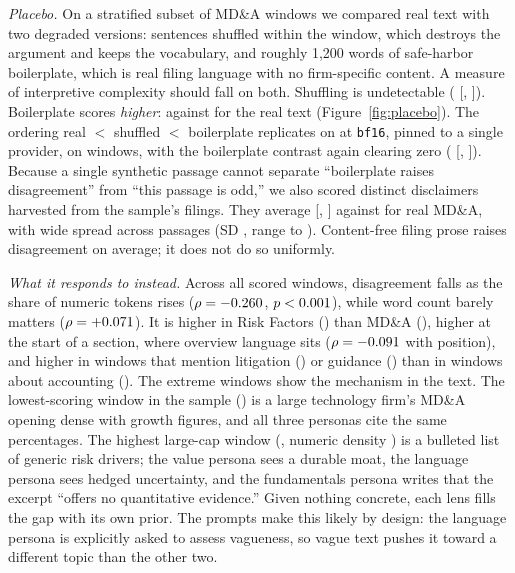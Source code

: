 \documentclass[sigconf,nonacm]{acmart}
\begin{document}
\emph{Placebo.} On a stratified subset of \PlacN{} MD\&A windows we compared real text
with two degraded versions: sentences shuffled within the window, which destroys the
argument and keeps the vocabulary, and roughly 1,200 words of safe-harbor boilerplate,
which is real filing language with no firm-specific content. A measure of interpretive
complexity should fall on both. Shuffling is undetectable (\PlacDiffShuffled{}
[\PlacDiffShuffledLo, \PlacDiffShuffledHi]). Boilerplate scores \emph{higher}:
\PlacBoilerplate{} against \PlacReal{} for the real text (Figure~\ref{fig:placebo}).
The ordering real $<$ shuffled $<$ boilerplate replicates on
\XmModel{} at \texttt{bf16}, pinned to a single provider, on \XmN{} windows, with the
boilerplate contrast again clearing zero (\XmDiffBoil{} [\XmDiffBoilLo,
\XmDiffBoilHi]). Because a single synthetic passage cannot separate ``boilerplate
raises disagreement'' from ``this passage is odd,'' we also scored \BpN{} distinct
disclaimers harvested from the sample's filings. They average \BpMean{}
[\BpLo, \BpHi] against \BpRealMean{} for real MD\&A, with wide spread across passages
(SD \BpSD, range \BpMin{} to \BpMax). Content-free filing prose raises disagreement on
average; it does not do so uniformly.

\emph{What it responds to instead.} Across all scored windows, disagreement falls as
the share of numeric tokens rises ($\rho=-0.260$, $p<0.001$), while word
count barely matters ($\rho=+0.071$). It is higher in Risk Factors
(\DisagRisk) than MD\&A (\DisagMDA), higher at the start of a section, where overview
language sits ($\rho=-0.091$ with position), and higher in windows that mention
litigation (\TopicLit) or guidance (\TopicGuid) than in windows about accounting
(\TopicAcct). The extreme windows show the mechanism in the text. The lowest-scoring
window in the sample (\CaseLowDisag) is a large technology firm's MD\&A opening dense
with growth figures, and all three personas cite the same percentages. The highest
large-cap window (\CaseHighDisag, numeric density \CaseHighDensity) is a bulleted list
of generic risk drivers; the value persona sees a durable moat, the language persona
sees hedged uncertainty, and the fundamentals persona writes that the excerpt ``offers
no quantitative evidence.'' Given nothing concrete, each lens fills the gap with its own
prior. The prompts make this likely by design: the language persona is explicitly asked
to assess vagueness, so vague text pushes it toward a different topic than the other
two.
\end{document}
